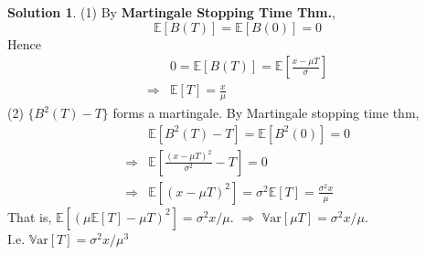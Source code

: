 \documentclass[a4paper, 10pt]{article}
\theoremstyle{definition}
\theoremstyle{hSol}
\newtheorem*{solution}{Solution}
\begin{document}
\begin{solution} (1) By \textbf{Martingale Stopping Time Thm.}, 
$$
\mathbb{E}\left[B(T)\right] = \mathbb{E}\left[B(0)\right] = 0
$$
Hence
\begin{equation}
  \begin{split}
    & 0 = \mathbb{E}\left[B(T)\right] = \mathbb{E}\left[\frac{x-\mu T}{\sigma}\right]\\
    \Rightarrow & \mathbb{E}\left[T\right] = \frac{x}{\mu}
  \end{split}
\end{equation}
(2) $\{B^2(T)-T\}$ forms a martingale. By Martingale stopping time thm, 
\begin{equation}
  \begin{split}
    & \mathbb{E}\left[B^2(T)-T\right] = \mathbb{E}\left[B^2(0)\right] = 0 \\
    \Rightarrow & \mathbb{E}\left[\frac{(x-\mu T)^2}{\sigma^2}-T\right] = 0 \\
    \Rightarrow & \mathbb{E}\left[(x-\mu T)^2\right] = \sigma^2\mathbb{E}\left[T\right] = \frac{\sigma^2 x}{\mu}
  \end{split}
\end{equation}
That is, $\mathbb{E}\left[(\mu \mathbb{E}\left[T\right]-\mu T)^2\right] = \sigma^2 x/\mu$. $\Rightarrow$ $\mathrm{\mathbb{V}ar}\left[\mu T\right] = \sigma^2 x/\mu$. \\
I.e. $\mathrm{\mathbb{V}ar}\left[T\right] = \sigma^2 x/\mu^3$
\end{solution}
\end{document}
